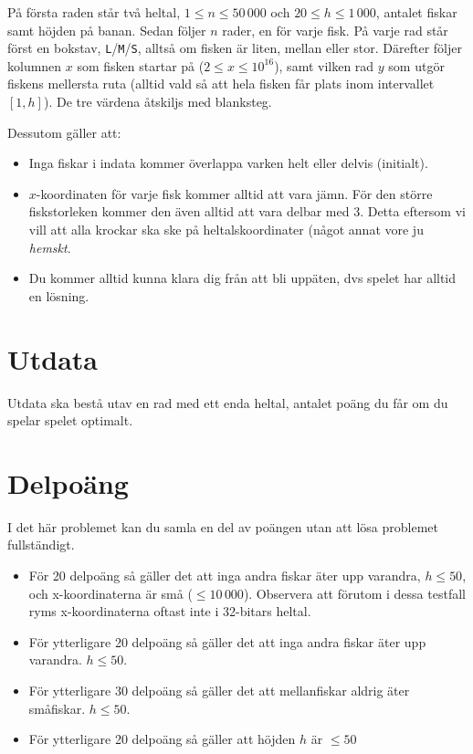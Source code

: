 På första raden står två heltal, $1 \leq n \leq 50\,000$ och $20 \leq
h \leq 1\,000$, antalet fiskar samt höjden på banan. Sedan följer $n$ rader,
en för varje fisk. På varje rad står först en bokstav, \texttt{L}/\texttt{M}/\texttt{S}, alltså om fisken är liten, mellan eller stor. Därefter följer kolumnen $x$ som fisken startar på ($2 \leq x \leq 10^{16}$), samt vilken rad $y$ som utgör fiskens mellersta ruta (alltid vald så att hela fisken får plats inom intervallet $[1, h]$). De tre värdena åtskiljs med blanksteg.

Dessutom gäller att:
\begin{itemize}
  \item
    Inga fiskar i indata kommer överlappa varken helt eller delvis (initialt).
  \item
      $x$-koordinaten för varje fisk kommer alltid att vara jämn. För den större
      fiskstorleken kommer den även alltid att vara delbar med 3. Detta
      eftersom vi vill att alla krockar ska ske på heltalskoordinater (något
      annat vore ju \emph{hemskt}.
  \item
    Du kommer alltid kunna klara dig från att bli uppäten, dvs spelet har
    alltid en lösning.
\end{itemize}

\section*{Utdata}
Utdata ska bestå utav en rad med ett enda heltal, antalet poäng du får om du spelar spelet optimalt.

\section*{Delpoäng}
I det här problemet kan du samla en del av poängen utan att lösa problemet fullständigt.

\begin{itemize}
    \item För 20 delpoäng så gäller det att inga andra fiskar äter upp
          varandra, $h \leq 50$, och x-koordinaterna är små ($\leq 10\,000$). Observera att förutom i dessa testfall ryms x-koordinaterna oftast inte i 32-bitars heltal.
    \item För ytterligare 20 delpoäng så gäller det att inga andra fiskar
          äter upp varandra. $h \leq 50$.
    \item För ytterligare 30 delpoäng så gäller det att mellanfiskar aldrig
          äter småfiskar. $h \leq 50$.
    \item För ytterligare 20 delpoäng så gäller att höjden $h$ är $\leq 50$
\end{itemize}

